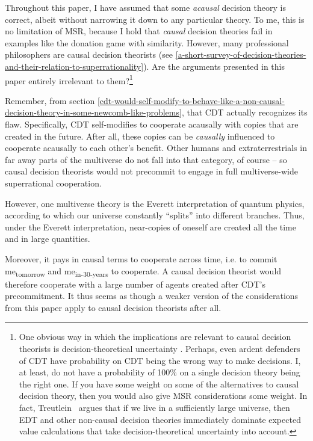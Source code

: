 Throughout this paper, I have assumed that some \emph{acausal} decision
theory is correct, albeit without narrowing it down to any particular
theory. To me, this is no limitation of MSR, because I hold that
\emph{causal} decision theories fail in examples like the donation game
with similarity. However, many professional philosophers are causal
decision theorists (see
\ref{a-short-survey-of-decision-theories-and-their-relation-to-superrationality}). Are the arguments presented in this paper
entirely irrelevant to them?\footnote{One obvious way in which the
  implications are relevant to causal decision theorists is
  decision-theoretical uncertainty
  \parencite{MacAskill2016-zo}. Perhaps, even ardent
  defenders of CDT have probability on CDT being the wrong way to make
  decisions. I, at least, do not have a probability of 100\% on a single
  decision theory being the right one. If you have some weight on some
  of the alternatives to causal decision theory, then you would also
  give MSR considerations some weight. In fact, Treutlein~\parencite{Treutlein201X} 
  argues that if we live in a sufficiently large universe,
  then EDT and other non-causal decision theories immediately dominate
  expected value calculations that take decision-theoretical uncertainty
  into account.}

Remember, from section
\ref{cdt-would-self-modify-to-behave-like-a-non-causal-decision-theory-in-some-newcomb-like-problems}, that CDT actually recognizes its flaw. Specifically,
CDT self-modifies to cooperate acausally with copies that are created in
the future. After all, these copies can be \emph{causally} influenced to
cooperate acausally to each other's benefit. Other humans and
extraterrestrials in far away parts of the multiverse do not fall into
that category, of course -- so causal decision theorists would not
precommit to engage in full multiverse-wide superrational cooperation.

However, one multiverse theory is the Everett interpretation of quantum
physics, according to which our universe constantly ``splits'' into
different branches. Thus, under the Everett interpretation, near-copies
of oneself are created all the time and in large quantities.

Moreover, it pays in causal terms to cooperate across time, i.e. to
commit me\textsubscript{tomorrow} and me\textsubscript{in-30-years} to
cooperate. A causal decision theorist would therefore cooperate with a
large number of agents created after CDT's precommitment. It thus seems
as though a weaker version of the considerations from this paper apply
to causal decision theorists after all.

